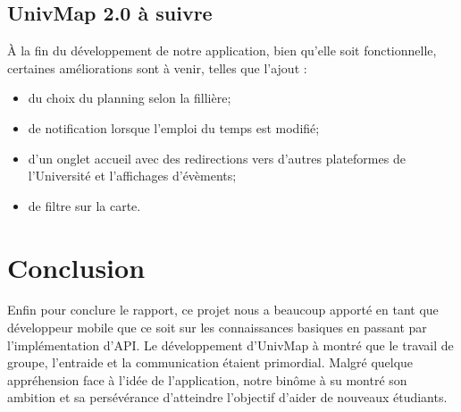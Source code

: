 \documentclass{article}
\begin{document}
\subsection{UnivMap 2.0 à suivre}
À la fin du développement de notre application,  bien qu'elle soit fonctionnelle, certaines améliorations sont à venir, telles que l'ajout :
\begin{itemize}
    \item du choix du planning selon la fillière;

    \item de notification lorsque l'emploi du temps est modifié;

    \item d'un onglet accueil avec des redirections vers d'autres plateformes de l'Université et l'affichages d'évèments;
    
    \item de filtre sur la carte.
    
\end{itemize}



\section{Conclusion}


Enfin pour conclure le rapport, ce projet nous a beaucoup apporté en tant que développeur mobile
que ce soit sur les connaissances basiques en passant par l'implémentation d'API. Le développement d'UnivMap
à montré que le travail de groupe, l'entraide et la communication étaient primordial.
Malgré quelque appréhension face à l'idée de l'application, notre binôme à su montré son ambition et
sa persévérance d'atteindre l'objectif d'aider de nouveaux étudiants.







\end{document}
